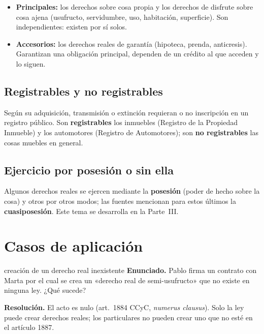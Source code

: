\documentclass[12pt,oneside]{book}
\begin{document}
\begin{itemize}
    \item \textbf{Principales:} los derechos sobre cosa propia y los derechos de disfrute sobre cosa ajena (usufructo, servidumbre, uso, habitación, superficie). Son independientes: existen por sí solos.
    \item \textbf{Accesorios:} los derechos reales de garantía (hipoteca, prenda, anticresis). Garantizan una obligación principal, dependen de un crédito al que acceden y lo siguen.
\end{itemize}

\subsection{Registrables y no registrables}

Según su adquisición, transmisión o extinción requieran o no inscripción en un registro público. Son \textbf{registrables} los inmuebles (Registro de la Propiedad Inmueble) y los automotores (Registro de Automotores); son \textbf{no registrables} las cosas muebles en general.

\subsection{Ejercicio por posesión o sin ella}

Algunos derechos reales se ejercen mediante la \textbf{posesión} (poder de hecho sobre la cosa) y otros por otros modos; las fuentes mencionan para estos últimos la \textbf{cuasiposesión}. Este tema se desarrolla en la Parte~III.

\section{Casos de aplicación}

\begin{ejercicio}{creación de un derecho real inexistente}
\textbf{Enunciado.} Pablo firma un contrato con Marta por el cual se crea un «derecho real de semi-usufructo» que no existe en ninguna ley. ¿Qué sucede?

\textbf{Resolución.} El acto es nulo (art.~1884 CCyC, \textit{numerus clausus}). Solo la ley puede crear derechos reales; los particulares no pueden crear uno que no esté en el artículo 1887.
\end{ejercicio}
\end{document}
